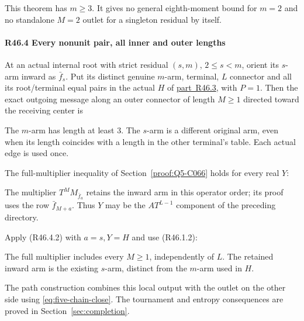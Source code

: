 This theorem has \(m\ge3\). It gives no general eighth-moment bound
for \(m=2\) and no standalone \(M=2\) outlet for a singleton residual
by itself.

\paragraph{R46.4 Every nonunit pair, all inner and outer lengths}

At an actual internal root with strict residual \((s,m)\), \(2\le s<m\),
orient its \(s\)-arm inward as \(\bar f_s\). Put its distinct genuine \(m\)-arm,
terminal, \(L\) connector and all its root/terminal equal pairs in
the actual \(H\) of \mbox{\hyperref[part:R46.3]{part R46.3}}, with \(P=1\). Then the exact outgoing
message along an outer connector of length \(M\ge 1\) directed toward
the receiving center is


The \(m\)-arm has length at least \(3\). The \(s\)-arm is a different original arm,
even when its length coincides with a length in the other
terminal's table. Each actual edge is used once.

The full-multiplier inequality of Section~\ref{proof:Q5-C066} holds for every real \(Y\):


The multiplier \(T^M M_{\bar f_a}\) retains the inward arm in this
operator order; its proof uses the row \(\bar f_{M+a}\). Thus \(Y\)
may be the \(AT^{L-1}\) component of the preceding directory.

Apply (R46.4.2) with \(a=s,\allowbreak  Y=H\) and use (R46.1.2):


The full multiplier includes every \(M\ge1\), independently of \(L\).
The retained inward arm is the existing \(s\)-arm, distinct from the
\(m\)-arm used in \(H\).

The path construction combines this local output with the outlet
on the other side using \eqref{eq:five-chain-close}. The tournament
and entropy consequences are proved in Section~\ref{sec:completion}.

